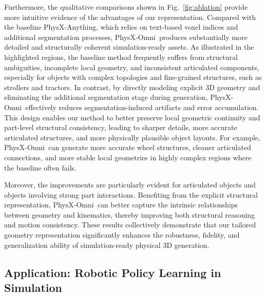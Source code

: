 \documentclass[11pt]{article}
\def\ourname{PhysX-Omni}
\begin{document}
Furthermore, the qualitative comparisons shown in Fig.~\ref{fig:ablation} provide more intuitive evidence of the advantages of our representation. Compared with the baseline PhysX-Anything, which relies on text-based voxel indices and additional segmentation processes, \ourname\ produces substantially more detailed and structurally coherent simulation-ready assets. As illustrated in the highlighted regions, the baseline method frequently suffers from structural ambiguities, incomplete local geometry, and inconsistent articulated components, especially for objects with complex topologies and fine-grained structures, such as strollers and tractors. In contrast, by directly modeling explicit 3D geometry and eliminating the additional segmentation stage during generation, \ourname\ effectively reduces segmentation-induced artifacts and error accumulation. This design enables our method to better preserve local geometric continuity and part-level structural consistency, leading to sharper details, more accurate articulated structures, and more physically plausible object layouts. For example, \ourname\ can generate more accurate wheel structures, cleaner articulated connections, and more stable local geometries in highly complex regions where the baseline often fails.

Moreover, the improvements are particularly evident for articulated objects and objects involving strong part interactions. Benefiting from the explicit structural representation, \ourname\ can better capture the intrinsic relationships between geometry and kinematics, thereby improving both structural reasoning and motion consistency. These results collectively demonstrate that our tailored geometry representation significantly enhances the robustness, fidelity, and generalization ability of simulation-ready physical 3D generation.


    


\subsection{Application: Robotic Policy Learning in Simulation}
\end{document}
